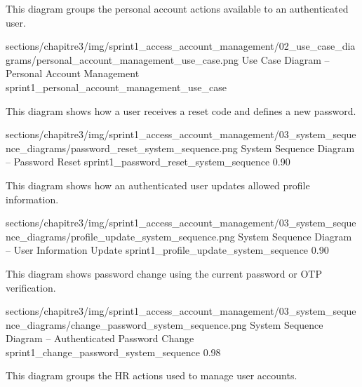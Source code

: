 \Needspace{7.2cm}

\noindent This diagram groups the personal account actions available to an authenticated user.\par

\ChapterThreeFigure
{sections/chapitre3/img/sprint1_access_account_management/02_use_case_diagrams/personal_account_management_use_case.png}
{Use Case Diagram – Personal Account Management}
{sprint1_personal_account_management_use_case}

\Needspace{7.2cm}

\noindent This diagram shows how a user receives a reset code and defines a new password.\par

\ChapterThreeFigureSized
{sections/chapitre3/img/sprint1_access_account_management/03_system_sequence_diagrams/password_reset_system_sequence.png}
{System Sequence Diagram – Password Reset}
{sprint1_password_reset_system_sequence}
{0.90}

\Needspace{7.2cm}

\noindent This diagram shows how an authenticated user updates allowed profile information.\par

\ChapterThreeFigureSized
{sections/chapitre3/img/sprint1_access_account_management/03_system_sequence_diagrams/profile_update_system_sequence.png}
{System Sequence Diagram – User Information Update}
{sprint1_profile_update_system_sequence}
{0.90}



\Needspace{10cm}

\noindent This diagram shows password change using the current password or OTP verification.\par

\ChapterThreeFigureSized
{sections/chapitre3/img/sprint1_access_account_management/03_system_sequence_diagrams/change_password_system_sequence.png}
{System Sequence Diagram – Authenticated Password Change}
{sprint1_change_password_system_sequence}
{0.98}

\Needspace{10cm}

\noindent This diagram groups the HR actions used to manage user accounts.\par

